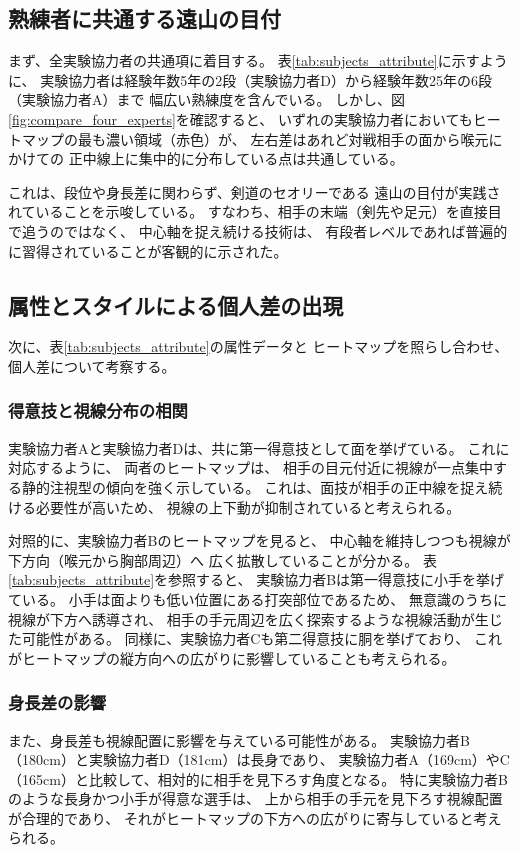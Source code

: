 \documentclass[dvipdfmx]{ujreport}
\begin{document}
    \subsection{熟練者に共通する遠山の目付}
    まず、全実験協力者の共通項に着目する。
    表\ref{tab:subjects_attribute}に示すように、
    実験協力者は経験年数5年の2段（実験協力者D）から経験年数25年の6段（実験協力者A）まで
    幅広い熟練度を含んでいる。
    しかし、図\ref{fig:compare_four_experts}を確認すると、
    いずれの実験協力者においてもヒートマップの最も濃い領域（赤色）が、
    左右差はあれど対戦相手の面から喉元にかけての
    正中線上に集中的に分布している点は共通している。
    
    これは、段位や身長差に関わらず、剣道のセオリーである
    遠山の目付が実践されていることを示唆している。
    すなわち、相手の末端（剣先や足元）を直接目で追うのではなく、
    中心軸を捉え続ける技術は、
    有段者レベルであれば普遍的に習得されていることが客観的に示された。

    \subsection{属性とスタイルによる個人差の出現}
    次に、表\ref{tab:subjects_attribute}の属性データと
    ヒートマップを照らし合わせ、個人差について考察する。

    \subsubsection{得意技と視線分布の相関}
    実験協力者Aと実験協力者Dは、共に第一得意技として面を挙げている。
    これに対応するように、
    両者のヒートマップは、
    相手の目元付近に視線が一点集中する静的注視型の傾向を強く示している。
    これは、面技が相手の正中線を捉え続ける必要性が高いため、
    視線の上下動が抑制されていると考えられる。

    対照的に、実験協力者Bのヒートマップを見ると、
    中心軸を維持しつつも視線が下方向（喉元から胸部周辺）へ
    広く拡散していることが分かる。
    表\ref{tab:subjects_attribute}を参照すると、
    実験協力者Bは第一得意技に小手を挙げている。
    小手は面よりも低い位置にある打突部位であるため、
    無意識のうちに視線が下方へ誘導され、
    相手の手元周辺を広く探索するような視線活動が生じた可能性がある。
    同様に、実験協力者Cも第二得意技に胴を挙げており、
    これがヒートマップの縦方向への広がりに影響していることも考えられる。

    \subsubsection{身長差の影響}
    また、身長差も視線配置に影響を与えている可能性がある。
    実験協力者B（180cm）と実験協力者D（181cm）は長身であり、
    実験協力者A（169cm）やC（165cm）と比較して、相対的に相手を見下ろす角度となる。
    特に実験協力者Bのような長身かつ小手が得意な選手は、
    上から相手の手元を見下ろす視線配置が合理的であり、
    それがヒートマップの下方への広がりに寄与していると考えられる。
\end{document}
